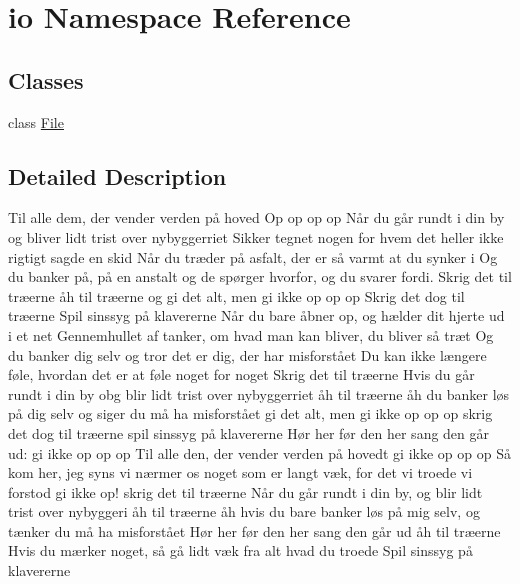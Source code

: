 \hypertarget{namespaceio}{}\section{io Namespace Reference}
\label{namespaceio}
\subsection*{Classes}
\begin{DoxyCompactItemize}
\item 
class \hyperlink{classio_1_1_file}{File}
\end{DoxyCompactItemize}


\subsection{Detailed Description}
Til alle dem, der vender verden på hoved Op op op op Når du går rundt i din by og bliver lidt trist over nybyggerriet Sikker tegnet nogen for hvem det heller ikke rigtigt sagde en skid Når du træder på asfalt, der er så varmt at du synker i Og du banker på, på en anstalt og de spørger hvorfor, og du svarer fordi. Skrig det til træerne åh til træerne og gi det alt, men gi ikke op op op Skrig det dog til træerne Spil sinssyg på klavererne Når du bare åbner op, og hælder dit hjerte ud i et net Gennemhullet af tanker, om hvad man kan bliver, du bliver så træt Og du banker dig selv og tror det er dig, der har misforstået Du kan ikke længere føle, hvordan det er at føle noget for noget Skrig det til træerne Hvis du går rundt i din by obg blir lidt trist over nybyggerriet åh til træerne åh du banker løs på dig selv og siger du må ha misforstået gi det alt, men gi ikke op op op skrig det dog til træerne spil sinssyg på klavererne Hør her før den her sang den går ud\+: gi ikke op op op Til alle den, der vender verden på hovedt gi ikke op op op Så kom her, jeg syns vi nærmer os noget som er langt væk, for det vi troede vi forstod gi ikke op! skrig det til træerne Når du går rundt i din by, og blir lidt trist over nybyggeri åh til træerne åh hvis du bare banker løs på mig selv, og tænker du må ha misforstået Hør her før den her sang den går ud åh til træerne Hvis du mærker noget, så gå lidt væk fra alt hvad du troede Spil sinssyg på klavererne 